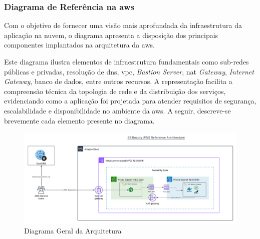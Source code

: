 \subsubsection{Diagrama de Referência na \gls{aws}}

Com o objetivo de fornecer uma visão mais aprofundada da infraestrutura da aplicação na nuvem, o diagrama apresenta a disposição dos principais componentes implantados na arquitetura da \gls{aws}.

Este diagrama ilustra elementos de infraestrutura fundamentais como sub-redes públicas e privadas, resolução de \gls{dns}, \gls{vpc}, \emph{Bastion Server}, \gls{nat} \emph{Gateway}, \emph{Internet Gateway}, banco de dados, entre outros recursos. A representação facilita a compreensão técnica da topologia de rede e da distribuição dos serviços, evidenciando como a aplicação foi projetada para atender requisitos de segurança, escalabilidade e disponibilidade no ambiente da \gls{aws}. A seguir, descreve-se brevemente cada elemento presente no diagrama.

\begin{figure}[htb]
  \centering
  \includegraphics[width=\textwidth]{cap04-desenvolvimento/images/4-3-2-3-diagrama-geral}
  \caption{Diagrama Geral da Arquitetura}
  \label{fig:diagrama-geral}
\end{figure}
\FloatBarrier

